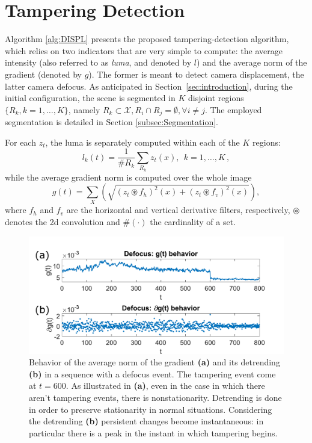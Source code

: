 \documentclass{llncs}
\begin{document}
\section{Tampering Detection}\label{sec:propSol}

Algorithm \ref{alg:DISPL} presents the proposed tampering-detection algorithm, which relies on two indicators that are very simple to compute: the average intensity (also referred to as \emph{luma}, and denoted by $l$) and the average norm of the gradient (denoted by $g$). The former is meant to detect camera displacement, the latter camera defocus. As anticipated in Section~\ref{sec:introduction}, during the initial configuration, the scene is segmented in $K$ disjoint regions $\{R_k, k = 1,\dots,K\}$, namely $R_k \subset \mathcal{X}, R_i \cap R_j = \emptyset, \forall i \neq j$. The employed segmentation is detailed in Section \ref{subsec:Segmentation}. 



For each $z_t$, the luma is separately computed within each of the $K$ regions:
\begin{equation}\label{eq:lumaRegions}
l_k(t) =\frac{1}{\#R_k} \sum_{R_k} z_t(x), \ \ k = 1, \dots, K\,,
\end{equation}
while the average gradient norm is computed over the whole image
\begin{equation}
\label{eq:normaGradiente}
g(t) = \sum_X \left (\sqrt{\left(z_t \circledast f_h\right)^2(x) + \left(z_t \circledast f_v\right)^2(x)}\right),
\end{equation}
where $f_h$ and $f_v$ are the horizontal and vertical derivative filters, respectively, $\circledast$ denotes the 2d convolution and $\#(\cdot)$ the cardinality of a set.

\begin{figure}[tb]
\centering
\includegraphics[width=1\linewidth]{Immagini/indicatori}
\caption{Behavior of the average norm of the gradient \textbf{(a)} and its detrending \textbf{(b)} in a sequence with a defocus event.
The tampering event come at $t = 600$.
As illustrated in \textbf{(a)}, even in the case in which there aren't tampering events, there is nonstationarity.
Detrending is done in order to preserve stationarity in normal situations.
Considering the detrending \textbf{(b)} persistent changes become instantaneous:
in particular there is a peak in the instant in which tampering begins.}
\label{fig:indicatori} 
\end{figure}
\end{document}
